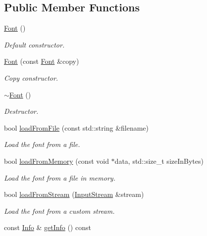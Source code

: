 \subsection*{Public Member Functions}
\begin{DoxyCompactItemize}
\item 
\hyperlink{classsf_1_1_font_a506404655b8869ed60d1e7709812f583}{Font} ()
\begin{DoxyCompactList}\small\item\em Default constructor. \end{DoxyCompactList}\item 
\hyperlink{classsf_1_1_font_a72d7322b355ee2f1be4500f530e98081}{Font} (const \hyperlink{classsf_1_1_font}{Font} \&copy)
\begin{DoxyCompactList}\small\item\em Copy constructor. \end{DoxyCompactList}\item 
\hyperlink{classsf_1_1_font_aa18a3c62e6e01e9a21c531b5cad4b7f2}{$\sim$\+Font} ()
\begin{DoxyCompactList}\small\item\em Destructor. \end{DoxyCompactList}\item 
bool \hyperlink{classsf_1_1_font_ab020052ef4e01f6c749a85571c0f3fd1}{load\+From\+File} (const std\+::string \&filename)
\begin{DoxyCompactList}\small\item\em Load the font from a file. \end{DoxyCompactList}\item 
bool \hyperlink{classsf_1_1_font_abf2f8d6de31eb4e1db02e061c323e346}{load\+From\+Memory} (const void $\ast$data, std\+::size\+\_\+t size\+In\+Bytes)
\begin{DoxyCompactList}\small\item\em Load the font from a file in memory. \end{DoxyCompactList}\item 
bool \hyperlink{classsf_1_1_font_abc3f37a354ce8b9a21f8eb93bd9fdafb}{load\+From\+Stream} (\hyperlink{classsf_1_1_input_stream}{Input\+Stream} \&stream)
\begin{DoxyCompactList}\small\item\em Load the font from a custom stream. \end{DoxyCompactList}\item 
const \hyperlink{structsf_1_1_font_1_1_info}{Info} \& \hyperlink{classsf_1_1_font_a7f33b30315f6ce8d8b4acfdabba065f7}{get\+Info} () const

\end{DoxyCompactItemize}
